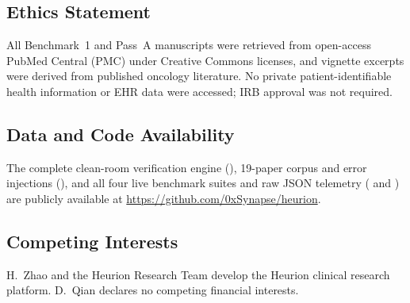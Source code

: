 \documentclass[11pt,a4paper]{article}
\begin{document}
\subsection*{Ethics Statement}
All Benchmark~1 and Pass~A manuscripts were retrieved from open-access PubMed Central (PMC) under Creative Commons licenses, and vignette excerpts were derived from published oncology literature. No private patient-identifiable health information or EHR data were accessed; IRB approval was not required.

\subsection*{Data and Code Availability}
The complete clean-room verification engine (), 19-paper corpus and error injections (), and all four live benchmark suites and raw JSON telemetry ( and ) are publicly available at \url{https://github.com/0xSynapse/heurion}.

\subsection*{Competing Interests}
H.~Zhao and the Heurion Research Team develop the Heurion clinical research platform. D.~Qian declares no competing financial interests.
\end{document}
